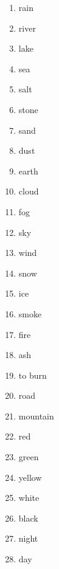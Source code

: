 \begin{multicols}{2}
\begin{enumerate}
\item   rain 

\item   river 

\item   lake 

\item   sea 

\item   salt 

\item   stone 

\item   sand 

\item   dust 

\item   earth 

\item   cloud 

\item   fog 

\item   sky 

\item   wind 

\item   snow 

\item   ice 

\item   smoke 

\item   fire 

\item   ash 

\item   to burn 

\item   road 

\item   mountain 

\item   red 

\item   green 

\item   yellow 

\item   white 

\item   black 

\item   night 

\item   day 


\end{enumerate}
\end{multicols}
